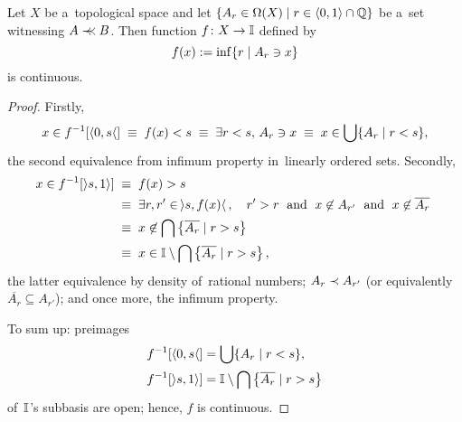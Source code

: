 \begin{lem} \label{cb->continuous}
  Let $X$ be a~topological space and let $\{A_r\in \Omega(X) \mid r\in \langle
  0, 1 \rangle \cap \mathbb{Q}\}$ be a~set witnessing $A \prec\mkern-8mu\prec B$.
  Then function $f\colon X \to \mathbb{I}$ defined by
  \[
    f(x) := \inf \{r \mid A_r \owns x\}
  \]
  is continuous.
\end{lem}
\begin{proof}
  Firstly,
  \[
    x\in f^{-1}[\langle 0, s \langle] \; \equiv \;
    f(x) < s \; \equiv \;
    \exists r < s, \, A_r \owns x \; \equiv \;
    x\in \bigcup \{ A_r \mid r < s \},
  \]
  the second equivalence from infimum property in~linearly ordered sets.
  Secondly,
  \begin{align*}
    x\in f^{-1}[\rangle s, 1 \rangle] \; &\equiv \;
    f(x) > s \\
    &\equiv \; \exists r, r' \in \,\rangle s, f(x) \langle\,, \quad  r' > r
    \;\text{ and }\; x\not\in A_{r'} \;\text{ and }\; x\not\in \overline{A_r}
    \; \\
    &\equiv \; x\not\in \bigcap \left\{ \overline{A_r} \mid r > s \right\} \\
    &\equiv \; x\in \mathbb{I}\setminus \bigcap \left\{ \overline{A_r} \mid r > s
    \right\},
  \end{align*}
  the latter equivalence by density of~rational numbers;
  $A_r \prec A_{r'}$ (or equivalently $\overline{A_r}\subseteq A_{r'}$);
  and once more, the infimum property.

  To sum up: preimages
  \begin{align*}
    f^{-1}[\langle 0, s \langle] &= \bigcup \{ A_r \mid r < s \}, \\
    f^{-1}[\rangle s, 1 \rangle] &= \mathbb{I}\setminus \bigcap \left\{ \overline{A_r} \mid r > s \right\}
  \end{align*}
  of~$\mathbb{I}$'s subbasis are open;
  hence, $f$ is continuous.
\end{proof}

